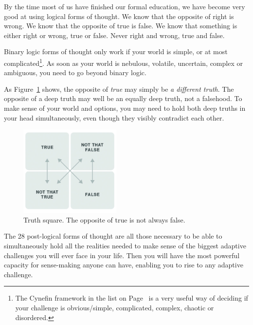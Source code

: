 By the time most of us have finished our formal education, we have become very good at using logical forms of thought. We know that the opposite of right is wrong. We know that the opposite of true is false. We know that something is either right or wrong, true or false. Never right and wrong, true and false.


Binary logic forms of thought only work if your world is simple, or at most complicated\footnote{The Cynefin framework in the list on Page~\pageref{list:cynefin} is a very useful way of deciding if your challenge is obvious/simple, complicated, complex, chaotic or disordered\cite{snowden-cynefin, cynefin}.}. As soon as your world is nebulous, volatile, uncertain, complex or ambiguous, you need to go beyond binary logic.


As Figure~\ref{figure:truth-square} shows, the opposite of \emph{true} may simply be \emph{a different truth}. The opposite of a deep truth may well be an equally deep truth, not a falsehood. To make sense of your world and options, you may need to hold both deep truths in your head simultaneously, even though they visibly contradict each other.


\begin{figure}
\includegraphics[width=0.45\textwidth]{./Images/truth-square}
\caption{Truth square. The opposite of true is not always false.}
\label{figure:truth-square}
\end{figure}


The 28 post-logical forms of thought are all those necessary to be able to simultaneously hold all the realities needed to make sense of the biggest adaptive challenges you will ever face in your life. Then you will have the most powerful capacity for sense-making anyone can have, enabling you to rise to any adaptive challenge.


